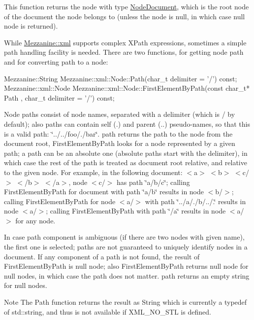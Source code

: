  This function returns the node with type \hyperlink{namespaceMezzanine_1_1xml_a524d867e34ff408b8f45a51b7924cb80}{NodeDocument}, which is the root node of the document the node belongs to (unless the node is null, in which case null node is returned). \par
 \par
 While \hyperlink{namespaceMezzanine_1_1xml}{Mezzanine::xml} supports complex XPath expressions, sometimes a simple path handling facility is needed. There are two functions, for getting node path and for converting path to a node: 
\begin{DoxyCode}
 Mezzanine::String Mezzanine::xml::Node::Path(char_t delimiter = '/') const;
 Mezzanine::xml::Node Mezzanine::xml::Node::FirstElementByPath(const char_t* Path
      , char_t delimiter = '/') const;
\end{DoxyCode}
 Node paths consist of node names, separated with a delimiter (which is / by default); also paths can contain self (.) and parent (..) pseudo-\/names, so that this is a valid path: \char`\"{}../../foo/./bar\char`\"{}. path returns the path to the node from the document root, FirstElementByPath looks for a node represented by a given path; a path can be an absolute one (absolute paths start with the delimiter), in which case the rest of the path is treated as document root relative, and relative to the given node. For example, in the following document: $<$a$>$ $<$b$>$ $<$c/$>$ $<$/b$>$ $<$/a$>$, node $<$c/$>$ has path \char`\"{}a/b/c\char`\"{}; calling FirstElementByPath for document with path \char`\"{}a/b\char`\"{} results in node $<$b/$>$; calling FirstElementByPath for node $<$a/$>$ with path \char`\"{}../a/./b/../.\char`\"{} results in node $<$a/$>$; calling FirstElementByPath with path \char`\"{}/a\char`\"{} results in node $<$a/$>$ for any node. \par
 \par
 In case path component is ambiguous (if there are two nodes with given name), the first one is selected; paths are not guaranteed to uniquely identify nodes in a document. If any component of a path is not found, the result of FirstElementByPath is null node; also FirstElementByPath returns null node for null nodes, in which case the path does not matter. path returns an empty string for null nodes. \begin{DoxyNote}{Note}
The Path function returns the result as String which is currently a typedef of std::string, and thus is not available if XML\_\-NO\_\-STL is defined.
\end{DoxyNote}
